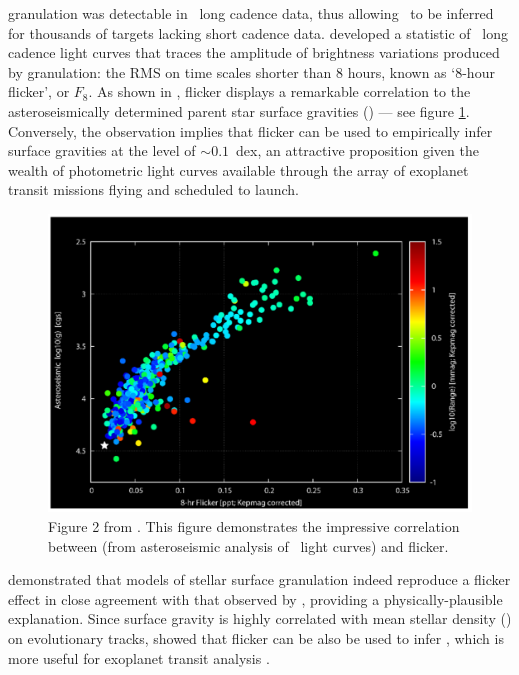 granulation was detectable in \kepler\ long cadence data, thus allowing \logg\
to be inferred for thousands of targets lacking short cadence data.
\citet{Bastien2013} developed a statistic of \kepler\ long cadence light
curves that traces the amplitude of brightness variations produced
by granulation: the RMS on time scales shorter than 8 hours, known as `8-hour
flicker', or $F_8$.
As shown in \citet{Bastien2013}, flicker displays a remarkable correlation to
the asteroseismically determined parent star surface gravities (\logg) --- see
figure \ref{fig:bastien}.
Conversely, the observation implies that flicker can be used to
empirically infer surface gravities at the level of $\sim0.1$\ dex, an
attractive proposition given the wealth of photometric light curves available
through the array of exoplanet transit missions flying and scheduled to
launch.

\begin{figure}
\begin{center}
\includegraphics[width=6in,angle=0,clip=true]{figures/flicker_bastien.pdf}
\caption[Flicker versus stellar surface gravity, from \citet{Bastien2013}.]
{Figure 2 from \citet{Bastien2013}.
This figure demonstrates the impressive correlation between \logg (from
asteroseismic analysis of \kepler\ light curves) and flicker.}
\label{fig:bastien}
\end{center}
\end{figure}

\citet{Cranmer2014} demonstrated that models of stellar surface granulation
indeed reproduce a flicker effect in close agreement with that observed by
\citet{Bastien2013}, providing a physically-plausible explanation.
Since surface gravity is highly correlated with mean stellar density (\rhostar)
on evolutionary tracks, \citet{Kipping2014} showed that flicker can be also
be used to infer \rhostar, which is more useful for exoplanet transit analysis
\citep{Seager2003}.

